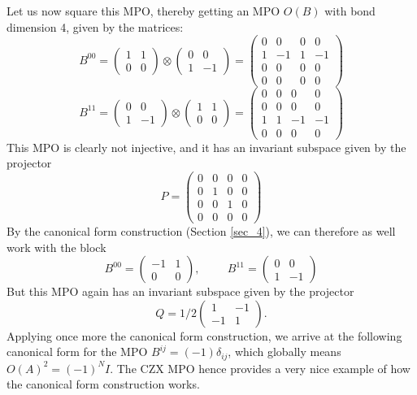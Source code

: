 \documentclass[rmp,aps,reprint,superscriptaddress,nobalancelastpage]{revtex4-1}
\begin{document}
    Let us now square this MPO, thereby getting an MPO $O(B)$ with bond dimension 4, given by the matrices:
    \[B^{00}=\begin{pmatrix}1 & 1 \\0 & 0\end{pmatrix}\otimes \begin{pmatrix}0 & 0\\1 & -1 \end{pmatrix}=\begin{pmatrix} 0 & 0 & 0 & 0\\1 & -1 & 1 & -1\\0 & 0 & 0 & 0\\0 & 0 & 0 & 0\end{pmatrix} \]
    \[B^{11}=\begin{pmatrix}0 & 0\\1 & -1 \end{pmatrix}\otimes\begin{pmatrix}1 & 1\\0 & 0\end{pmatrix}=\begin{pmatrix}0 & 0 & 0 & 0\\0 & 0 & 0 & 0\\1 & 1 & -1 & -1\\0 & 0 & 0 & 0 \end{pmatrix}\]
    This MPO is clearly not injective, and it has an invariant subspace given by the projector
    \[P=\begin{pmatrix}0 & 0 & 0 & 0\\0 & 1 & 0 & 0\\0 & 0 & 1 & 0\\0 & 0 & 0 & 0\end{pmatrix}\]
    By the canonical form construction (Section \ref{sec_4}), we can therefore as well work with the block
    \[B^{00}=\begin{pmatrix}-1 & 1\\0 & 0\end{pmatrix},\hspace{1cm} B^{11}=\begin{pmatrix}0 & 0\\1 & -1\end{pmatrix}\]
    But this MPO again has an invariant subspace given by the projector $$Q=1/2\begin{pmatrix}1 & -1\\-1 & 1\end{pmatrix}.$$ Applying once more the canonical form construction, we arrive at the following canonical form for the MPO
$B^{ij}= (-1)\delta_{ij}$, which globally means ${O}(A)^2=(-1)^N I$. The CZX MPO hence provides a very nice example of how the canonical form construction works.
\end{document}
